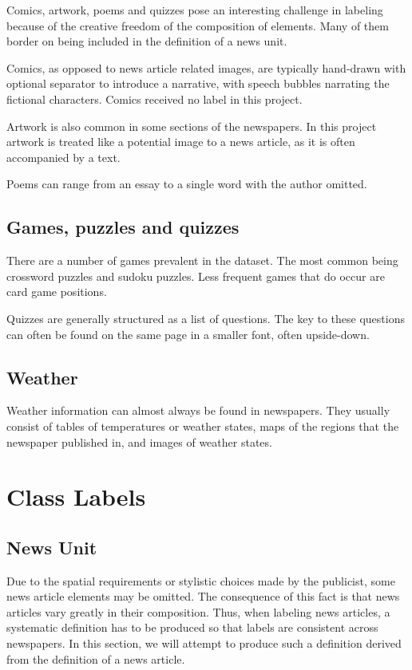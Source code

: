 \documentclass[english, bibtex]{kththesis}
\begin{document}
Comics, artwork, poems and quizzes pose an interesting challenge in labeling because of the creative freedom of the composition of elements. Many of them border on being included in the definition of a news unit.

Comics, as opposed to news article related images, are typically hand-drawn with optional separator to introduce a narrative, with speech bubbles narrating the fictional characters. Comics received no label in this project.

Artwork is also common in some sections of the newspapers. In this project artwork is treated like a potential image to a news article, as it is often accompanied by a text.

Poems can range from an essay to a single word with the author omitted.

\subsection{Games, puzzles and quizzes}

There are a number of games prevalent in the dataset. The most common being crossword puzzles and sudoku puzzles. Less frequent games that do occur are card game positions.

Quizzes are generally structured as a list of questions. The key to these questions can often be found on the same page in a smaller font, often upside-down.

\subsection{Weather}

Weather information can almost always be found in newspapers. They usually consist of tables of temperatures or weather states, maps of the regions that the newspaper published in, and images of weather states. 


\section{Class Labels}

\subsection{News Unit}

Due to the spatial requirements or stylistic choices made by the publicist, some news article elements may be omitted. The consequence of this fact is that news articles vary greatly in their composition. Thus, when labeling news articles, a systematic definition has to be produced so that labels are consistent across newspapers. In this section, we will attempt to produce such a definition derived from the definition of a news article.
\end{document}
